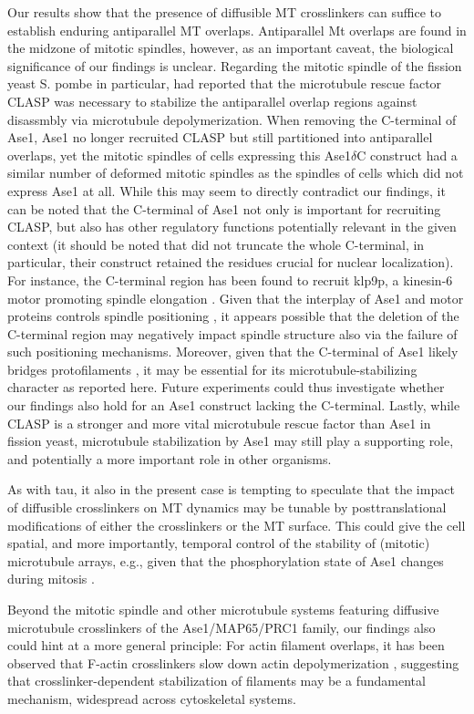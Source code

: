 Our results show that the presence of diffusible MT crosslinkers can suffice to establish enduring antiparallel MT overlaps. Antiparallel Mt overlaps are found in the midzone of mitotic spindles, however, as an important caveat, the biological significance of our findings is unclear. Regarding the mitotic spindle of the fission yeast S. pombe in particular, \cite{Bratman2007b} had reported that the microtubule rescue factor CLASP was necessary to stabilize the antiparallel overlap regions against disassmbly via microtubule depolymerization. When removing the C-terminal of Ase1, Ase1 no longer recruited CLASP but still partitioned into antiparallel overlaps, yet the mitotic spindles of cells expressing this Ase1$\delta$C construct had a similar number of deformed mitotic spindles as the spindles of cells which did not express Ase1 at all. While this may seem to directly contradict our findings, it can be noted that the C-terminal of Ase1 not only is important for recruiting CLASP, but also has other regulatory functions potentially relevant in the given context (it should be noted that \cite{Bratman2007b} did not truncate the whole C-terminal, in particular, their construct retained the residues crucial for nuclear localization). For instance, the C-terminal region has been found to recruit klp9p, a kinesin-6 motor promoting spindle elongation . Given that the interplay of Ase1 and motor proteins controls spindle positioning , it appears possible that the deletion of the C-terminal region may negatively impact spindle structure also via the failure of such positioning mechanisms. Moreover, given that the C-terminal of Ase1 likely bridges protofilaments , it may be essential for its microtubule-stabilizing character as reported here. Future experiments could thus investigate whether our findings also hold for an Ase1 construct lacking the C-terminal. Lastly, while CLASP is a stronger and more vital microtubule rescue factor than Ase1 in fission yeast, microtubule stabilization by Ase1 may still play a supporting role, and potentially a more important role in other organisms. \par

As with tau, it also in the present case is tempting to speculate that the impact of diffusible crosslinkers on MT dynamics may be tunable by posttranslational modifications of either the crosslinkers or the MT surface. This could give the cell spatial, and more importantly, temporal control of the stability of (mitotic) microtubule arrays, e.g., given that the phosphorylation state of Ase1 changes during mitosis . \par

Beyond the mitotic spindle and other microtubule systems featuring diffusive microtubule crosslinkers of the Ase1/MAP65/PRC1 family, our findings also could hint at a more general principle: For actin filament overlaps, it has been observed that F-actin crosslinkers slow down actin depolymerization \parencite{maul2003eplin,schmoller2011slow}, suggesting that crosslinker-dependent stabilization of filaments may be a fundamental mechanism, widespread across cytoskeletal systems.